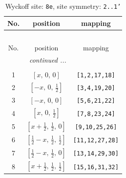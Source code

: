 \documentclass[fleqn,8pt]{jsarticle}
\begin{document}
\begin{longtable}{ccc}
\caption{Wyckoff site: {\tt 8e}, site symmetry: {\tt 2..1'}}
 \\
 \hline \hline
No. & position & mapping \\ \hline \endfirsthead

\multicolumn{2}{l}{\tablename\ \thetable{}} \\
 \hline \hline
No. & position & mapping \\ \hline \endhead

 \hline \hline
\multicolumn{2}{r}{\footnotesize\it continued ...} \\ \endfoot

 \hline \hline
\multicolumn{2}{r}{} \\ \endlastfoot

1 & $\left[ x,\, 0,\, 0 \right]$ & {\tt [1,2,17,18]} \\ \hline
2 & $\left[ - x,\, 0,\, \frac{1}{2} \right]$ & {\tt [3,4,19,20]} \\ \hline
3 & $\left[ - x,\, 0,\, 0 \right]$ & {\tt [5,6,21,22]} \\ \hline
4 & $\left[ x,\, 0,\, \frac{1}{2} \right]$ & {\tt [7,8,23,24]} \\ \hline
5 & $\left[ x + \frac{1}{2},\, \frac{1}{2},\, 0 \right]$ & {\tt [9,10,25,26]} \\ \hline
6 & $\left[ \frac{1}{2} - x,\, \frac{1}{2},\, \frac{1}{2} \right]$ & {\tt [11,12,27,28]} \\ \hline
7 & $\left[ \frac{1}{2} - x,\, \frac{1}{2},\, 0 \right]$ & {\tt [13,14,29,30]} \\ \hline
8 & $\left[ x + \frac{1}{2},\, \frac{1}{2},\, \frac{1}{2} \right]$ & {\tt [15,16,31,32]} \\
\end{longtable}
\renewcommand{\arraystretch}{1.2}
\end{document}
